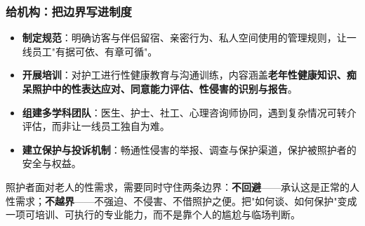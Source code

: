 \subsubsection{给机构：把边界写进制度}

\begin{itemize}
	\item \textbf{制定规范}：明确访客与伴侣留宿、亲密行为、私人空间使用的管理规则，让一线员工"有据可依、有章可循"。
	\item \textbf{开展培训}：对护工进行性健康教育与沟通训练，内容涵盖\textbf{老年性健康知识、痴呆照护中的性表达应对、同意能力评估、性侵害的识别与报告}。
	\item \textbf{组建多学科团队}：医生、护士、社工、心理咨询师协同，遇到复杂情况可转介评估，而非让一线员工独自为难。
	\item \textbf{建立保护与投诉机制}：畅通性侵害的举报、调查与保护渠道，保护被照护者的安全与权益。
\end{itemize}

\begin{tcolorbox}[colback=pink!5!white,colframe=red!50!black,title=核心原则]
照护者面对老人的性需求，需要同时守住两条边界：\textbf{不回避}——承认这是正常的人性需求；\textbf{不越界}——不强迫、不侵害、不借照护之便。把"如何谈、如何保护"变成一项可培训、可执行的专业能力，而不是靠个人的尴尬与临场判断。
\end{tcolorbox}
